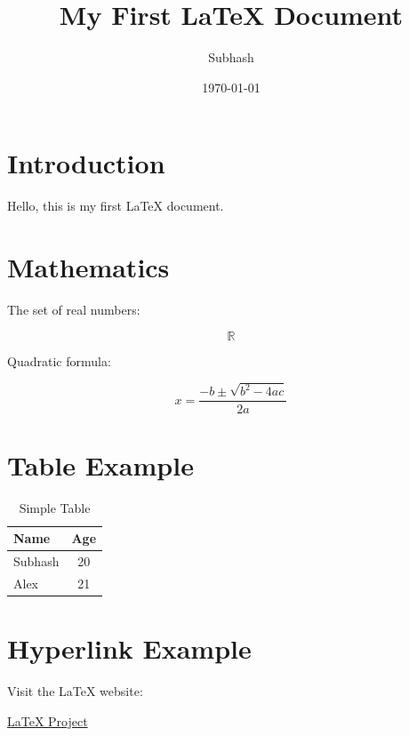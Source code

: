 \documentclass[12pt,a4paper]{article}
\title{My First LaTeX Document}
\author{Subhash}
\date{\today}
\begin{document}
\maketitle

\tableofcontents

\section{Introduction}

Hello, this is my first LaTeX document.

\section{Mathematics}

The set of real numbers:

\[
\mathbb{R}
\]

Quadratic formula:

\[
x=\frac{-b\pm\sqrt{b^2-4ac}}{2a}
\]

\section{Table Example}

\begin{table}[h]
\centering
\begin{tabular}{lc}
\toprule
Name & Age \\
\midrule
Subhash & 20 \\
Alex & 21 \\
\bottomrule
\end{tabular}
\caption{Simple Table}
\end{table}

\section{Hyperlink Example}

Visit the LaTeX website:

\href{https://www.latex-project.org}{LaTeX Project}
\end{document}
